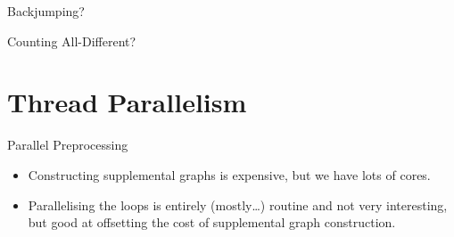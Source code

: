 \documentclass{beamer}
\begin{document}
\begin{frame}[t,plain]{Backjumping?}
    \only<1>{
        
    }
\end{frame}

\begin{frame}[t,plain]{Counting All-Different?}
    \only<1>{
        
    }
    \only<2>{
        
    }
\end{frame}

\section{Thread Parallelism}

\begin{frame}{Parallel Preprocessing}
    \begin{itemize}
        \item Constructing supplemental graphs is expensive, but we have lots of cores.
        \item Parallelising the loops is entirely (mostly\ldots) routine and not very interesting,
            but good at offsetting the cost of supplemental graph construction.
    \end{itemize}
\end{frame}
\end{document}
